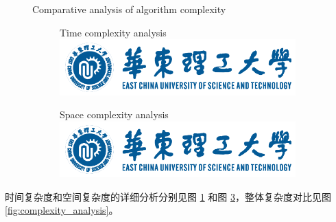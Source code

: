\begin{figure}[H] %
	\centering
	{Comparative analysis of algorithm complexity} %
	\label{fig:complexity_analysis} %
	
	\begin{subfigure}{0.45\textwidth} %
		\centering
		{Time complexity analysis} %
		\label{fig:time_complexity} %
		\includegraphics[width=0.85\linewidth]{figures/ECUST-logo.png}
	\end{subfigure}%
	\hfill %
	\begin{subfigure}{0.45\textwidth}
		\centering
		{Space complexity analysis} %
		\label{fig:space_complexity} %
		\includegraphics[width=0.85\linewidth]{figures/ECUST-logo.png}
	\end{subfigure}

\end{figure}



时间复杂度和空间复杂度的详细分析分别见图 \ref{fig:time_complexity} 和图 \ref{fig:space_complexity}，整体复杂度对比见图 \ref{fig:complexity_analysis}。
